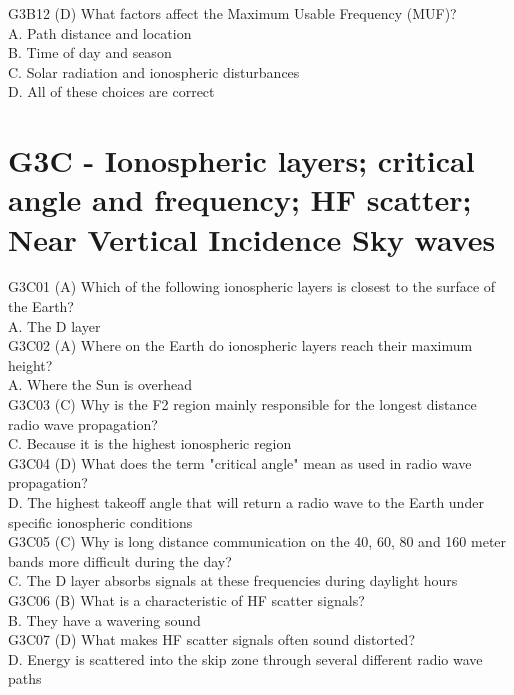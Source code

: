 \documentclass[12pt,letterpaper]{report}
\begin{document}
G3B12 (D) What factors affect the Maximum Usable Frequency (MUF)?\\
A. Path distance and location\\
B. Time of day and season\\
C. Solar radiation and ionospheric disturbances\\
D. All of these choices are correct\\

\section{G3C - Ionospheric layers; critical angle and frequency; HF scatter; Near Vertical Incidence Sky waves}

G3C01 (A) Which of the following ionospheric layers is closest to the surface of the Earth?\\
A. The D layer\\

G3C02 (A) Where on the Earth do ionospheric layers reach their maximum height?\\
A. Where the Sun is overhead\\

G3C03 (C) Why is the F2 region mainly responsible for the longest distance radio wave propagation?\\
C. Because it is the highest ionospheric region\\

G3C04 (D) What does the term "critical angle" mean as used in radio wave propagation?\\
D. The highest takeoff angle that will return a radio wave to the Earth under specific ionospheric conditions\\ 

G3C05 (C) Why is long distance communication on the 40, 60, 80 and 160 meter bands more difficult during the day?\\
C. The D layer absorbs signals at these frequencies during daylight hours\\

G3C06 (B) What is a characteristic of HF scatter signals?\\
B. They have a wavering sound\\

G3C07 (D) What makes HF scatter signals often sound distorted?\\
D. Energy is scattered into the skip zone through several different radio wave paths\\
\end{document}
